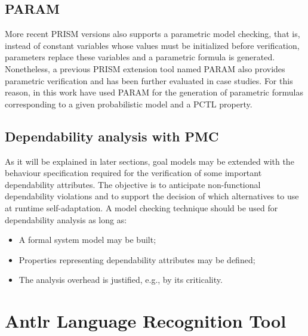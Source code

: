 \subsection{PARAM}

More recent PRISM versions also supports a parametric model checking, that is, instead of constant variables whose values must be initialized before verification, parameters replace these variables and a parametric formula is generated. Nonetheless, a previous PRISM extension tool named PARAM also provides parametric verification and has been further evaluated in case studies. For this reason, in this work have used PARAM for the generation of parametric formulas corresponding to a given probabilistic model and a PCTL property.

\subsection{Dependability analysis with PMC}

As it will be explained in later sections, goal models may be extended with the behaviour specification required for the verification of some important dependability attributes. The objective is to anticipate non-functional dependability violations and to support the decision of which alternatives to use at runtime self-adaptation. A model checking technique should be used for dependability analysis as long as: 

\begin{itemize}

\item A formal system model may be built;
\medskip

\item Properties representing dependability attributes may be defined;
\medskip

\item The analysis overhead is justified, e.g., by its criticality.
\bigskip

\end{itemize}


\section{Antlr Language Recognition Tool}

